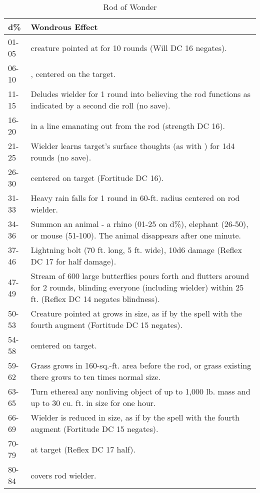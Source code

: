 \begin{table*}
\caption{Rod of Wonder}
\label{tab:RodOfWonder}
\centering
\begin{tabular}{lp{}}
\toprule
\textbf{d\%}&\textbf{Wondrous Effect}\\
\midrule
01-05&\nameref{Spell:Slow} creature pointed at for 10 rounds (Will DC 16 negates).\\
06-10&\nameref{Spell:FaerieFire}, centered on the target.\\
11-15&Deludes wielder for 1 round into believing the rod functions as indicated by a second die roll (no save).\\
16-20&\nameref{Spell:GustOfWind} in a line emanating out from the rod (strength DC 16).\\
21-25&Wielder learns target's surface thoughts (as with \nameref{Spell:ReadThoughts}) for 1d4 rounds (no save).\\
26-30&\nameref{Spell:NoxiousVapors} centered on target (Fortitude DC 16).\\
31-33&Heavy rain falls for 1 round in 60-ft. radius centered on rod wielder.\\
34-36&Summon an animal - a rhino (01-25 on d\%), elephant (26-50), or mouse (51-100). The animal disappears after one minute.\\
37-46&Lightning bolt (70 ft. long, 5 ft. wide), 10d6 damage (Reflex DC 17 for half damage).\\
47-49&Stream of 600 large butterflies pours forth and flutters around for 2 rounds, blinding everyone (including wielder) within 25 ft. (Reflex DC 14 negates blindness).\\
50-53&Creature pointed at grows in size, as if by the \nameref{Spell:AlterSize} spell with the fourth augment (Fortitude DC 15 negates).\\
54-58&\nameref{Spell:Darkness} centered on target.\\
59-62&Grass grows in 160-sq.-ft. area before the rod, or grass existing there grows to ten times normal size.\\
63-65&Turn ethereal any nonliving object of up to 1,000 lb. mass and up to 30 cu. ft. in size for one hour.\\
66-69&Wielder is reduced in size, as if by the \nameref{Spell:AlterSize} spell with the fourth augment (Fortitude DC 15 negates).\\
70-79&\nameref{Spell:Fireball} at target (Reflex DC 17 half).\\
80-84&\nameref{Spell:Invisibility} covers rod wielder.\\

\end{tabular}
\end{table*}
